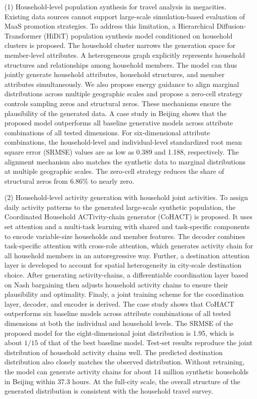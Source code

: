 \begin{englishabstract}
(1) Household-level population synthesis for travel analysis in megacities. Existing data sources cannot support large-scale simulation-based evaluation of MaaS promotion strategies. To address this limitation, a Hierarchical Diffusion-Transformer (HiDiT) population synthesis model conditioned on household clusters is proposed. The household cluster narrows the generation space for member-level attributes. A heterogeneous graph explicitly represents household structures and relationships among household members. The model can thus jointly generate household attributes, household structures, and member attributes simultaneously. We also propose energy guidance to align marginal distributions across multiple geographic scales and propose a zero-cell strategy controls sampling zeros and structural zeros. These mechanisms ensure the plausibility of the generated data. A case study in Beijing shows that the proposed model outperforms all baseline generative models across attribute combinations of all tested dimensions. For six-dimensional attribute combinations, the household-level and individual-level standardized root mean square error (SRMSE) values are as low as 0.389 and 1.188, respectively. The alignment mechanism also matches the synthetic data to marginal distributions at multiple geographic scales. The zero-cell strategy reduces the share of structural zeros from 6.86\% to nearly zero.

(2) Household-level activity generation with household joint activities. To assign daily activity patterns to the generated large-scale synthetic population, the Coordinated Household ACTivity-chain generator (CoHACT) is proposed. It uses set attention and a multi-task learning with shared and task-specific components to encode variable-size households and member features. The decoder combines task-specific attention with cross-role attention, which generates activity chain for all household members in an autoregressive way. Further, a destination attention layer is developed to account for spatial heterogeneity in city-scale destination choice. After generating activity-chains, a differentiable coordination layer based on Nash bargaining then adjusts household activity chains to ensure their plausibility and optimality. Finaly, a joint training scheme for the coordination layer, decoder, and encoder is derived. The case study shows that CoHACT outperforms six baseline models across attribute combinations of all tested dimensions at both the individual and household levels. The SRMSE of the proposed model for the eight-dimensional joint distribution is 1.95, which is about $1/15$ of that of the best baseline model. Test-set results reproduce the joint distribution of household activity chains well. The predicted destination distribution also closely matches the observed distribution. Without retraining, the model can generate activity chains for about 14 million synthetic households in Beijing within 37.3 hours. At the full-city scale, the overall structure of the generated distribution is consistent with the household travel survey.


\end{englishabstract}
